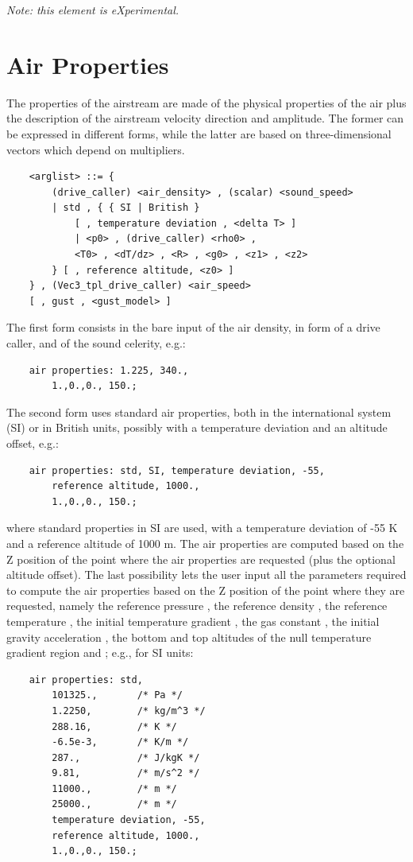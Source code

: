 \noindent
\emph{Note: this element is eXperimental.}




\section{Air Properties}\label{sec:EL:AERO:AIRPROPERTIES}
The properties of the airstream are made of the physical properties
of the air plus the description of the airstream velocity direction
and amplitude.
The former can be expressed in different forms, while the latter
are based on three-dimensional vectors which depend on multipliers.
\begin{verbatim}
    <arglist> ::= {
        (drive_caller) <air_density> , (scalar) <sound_speed> 
        | std , { { SI | British }
            [ , temperature deviation , <delta T> ]
            | <p0> , (drive_caller) <rho0> ,
            <T0> , <dT/dz> , <R> , <g0> , <z1> , <z2>
        } [ , reference altitude, <z0> ]
    } , (Vec3_tpl_drive_caller) <air_speed>
    [ , gust , <gust_model> ]
\end{verbatim}
The first form consists in the bare input of the air density,
in form of a drive caller, and of the sound celerity, e.g.:
\begin{verbatim}
    air properties: 1.225, 340.,
        1.,0.,0., 150.;
\end{verbatim}
The second form uses standard air properties, both in the
international system (SI) or in British units, possibly
with a temperature deviation and an altitude offset, e.g.:
\begin{verbatim}
    air properties: std, SI, temperature deviation, -55,
        reference altitude, 1000.,
        1.,0.,0., 150.;
\end{verbatim}
where standard properties in SI are used, with a temperature
deviation of -55 K and a reference altitude of 1000 m.
The air properties are computed based on the Z position of the
point where the air properties are requested (plus the optional
altitude offset).
The last possibility lets the user input all the parameters
required to compute the air properties based on the Z position
of the point where they are requested, namely the reference
pressure , the reference density ,
the reference temperature , the initial temperature
gradient , the gas constant , the
initial gravity acceleration , the bottom and top
altitudes of the null temperature gradient region  and
; e.g., for SI units:
\begin{verbatim}
    air properties: std,
        101325.,       /* Pa */
        1.2250,        /* kg/m^3 */
        288.16,        /* K */
        -6.5e-3,       /* K/m */
        287.,          /* J/kgK */
        9.81,          /* m/s^2 */
        11000.,        /* m */
        25000.,        /* m */
        temperature deviation, -55,
        reference altitude, 1000.,
        1.,0.,0., 150.;
\end{verbatim}
